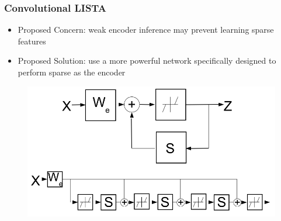 \documentclass{beamer}
\begin{document}
\begin{frame}
\frametitle{Convolutional LISTA}  
\begin{itemize}
\item Proposed Concern: weak encoder inference may prevent learning sparse features 
\item Proposed Solution: use a more powerful network specifically designed to perform sparse as the encoder  
\end{itemize} 
\begin{figure} 
\includegraphics[scale=0.20]{./figures/LISTA.png}
\end{figure} 
\end{frame} 
\end{document}
